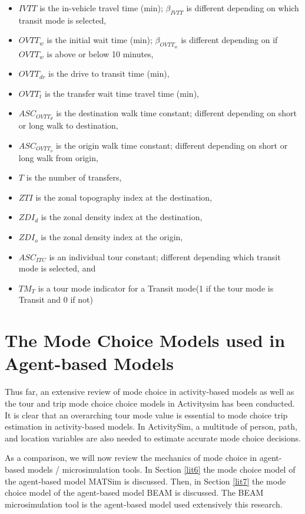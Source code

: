 \documentclass[12pt, oneside, openright]{byuthesis}
\providecommand{\tightlist}{%
  \setlength{\itemsep}{0pt}\setlength{\parskip}{0pt}}
\begin{document}
\begin{itemize}
\tightlist
\item
  \(IVTT\) is the in-vehicle travel time (min); \(\beta_{IVTT}\) is different depending on which transit mode is selected,
\item
  \(OVTT_w\) is the initial wait time (min); \(\beta_{OVTT_w}\) is different depending on if \(OVTT_w\) is above or below 10 minutes,
\item
  \(OVTT_{dr}\) is the drive to transit time (min),
\item
  \(OVTT_t\) is the transfer wait time travel time (min),\\
\item
  \(ASC_{OVTT_d}\) is the destination walk time constant; different depending on short or long walk to destination,
\item
  \(ASC_{OVTT_o}\) is the origin walk time constant; different depending on short or long walk from origin,
\item
  \(T\) is the number of transfers,
\item
  \(ZTI\) is the zonal topography index at the destination,
\item
  \(ZDI_d\) is the zonal density index at the destination,
\item
  \(ZDI_o\) is the zonal density index at the origin,
\item
  \(ASC_{ITC}\) is an individual tour constant; different depending which transit mode is selected, and
\item
  \(TM_{T}\) is a tour mode indicator for a Transit mode(1 if the tour mode is Transit and 0 if not)
\end{itemize}

\hypertarget{lit5}{%
\section{The Mode Choice Models used in Agent-based Models}\label{lit5}}

Thus far, an extensive review of mode choice in activity-based models as well as the tour and trip mode choice choice models in Activitysim has been conducted. It is clear that an overarching tour mode value is essential to mode choice trip estimation in activity-based models. In ActivitySim, a multitude of person, path, and location variables are also needed to estimate accurate mode choice decisions.

As a comparison, we will now review the mechanics of mode choice in agent-based models / microsimulation tools. In Section \ref{lit6} the mode choice model of the agent-based model MATSim is discussed. Then, in Section \ref{lit7} the mode choice model of the agent-based model BEAM is discussed. The BEAM microsimulation tool is the agent-based model used extensively this research.
\end{document}
